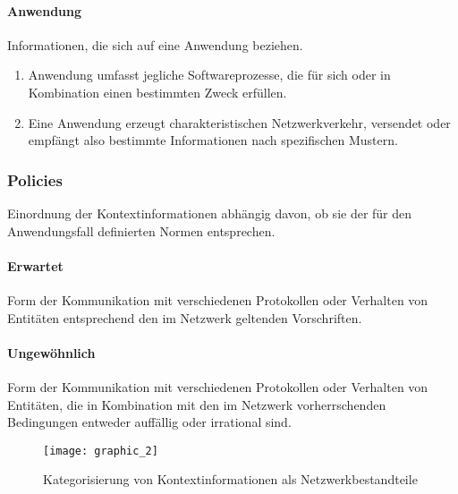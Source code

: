 \paragraph{Anwendung}
Informationen, die sich auf eine Anwendung beziehen.
\begin{enumerate}
\item{Anwendung umfasst jegliche Softwareprozesse, die für sich oder in Kombination einen bestimmten Zweck erfüllen.}
\item{Eine Anwendung erzeugt charakteristischen Netzwerkverkehr, versendet oder empfängt also bestimmte Informationen nach spezifischen Mustern.}
\end{enumerate}
\subsubsection{Policies}
Einordnung der Kontextinformationen abhängig davon, ob sie der für den Anwendungsfall definierten Normen entsprechen.
\paragraph{Erwartet}
Form der Kommunikation mit verschiedenen Protokollen oder Verhalten von Entitäten entsprechend den im Netzwerk geltenden Vorschriften.
\paragraph{Ungewöhnlich}
Form der Kommunikation mit verschiedenen Protokollen oder Verhalten von Entitäten, die in Kombination mit den im Netzwerk vorherrschenden Bedingungen entweder auffällig oder irrational sind.
\begin{figure}[H]
\centering
\texttt{[image: graphic\_2]}
\caption{Kategorisierung von Kontextinformationen als Netzwerkbestandteile}
\label{Tax_2} 
\end{figure}
